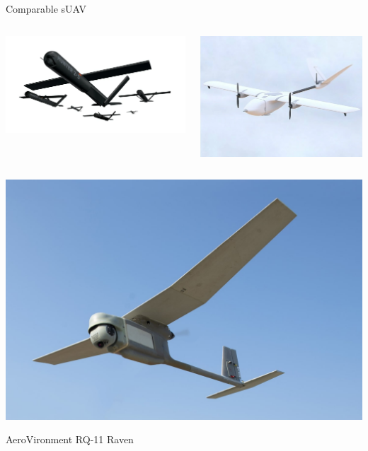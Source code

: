 \documentclass{beamer}
\begin{document}
    \begin{frame}{Comparable sUAV}
        \begin{columns}[T]
        \begin{column}{0.5\textwidth}
            \centering
            \includegraphics[width=.9\linewidth]{figures/market research/Hunter2S.png}
            \vspace{0.5em} %
        \end{column}
        \begin{column}{0.5\textwidth}
            \centering
            \includegraphics[width=0.65\linewidth]{figures/market research/MFDNimbus.png}
            \vspace{0.5em}
        \end{column}
        \end{columns}
        \vspace{.25em}
        \centering
        \includegraphics[width=0.35\linewidth]{figures/market research/RQ11Raven.jpg}
        \par
        AeroVironment RQ-11 Raven
    \end{frame}
    
\end{document}
